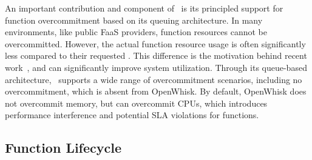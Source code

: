 An important contribution and component of \sysname~is its principled support for function overcommitment based on its queuing architecture.
In many environments, like public FaaS providers, function resources cannot be overcommitted. 
However, the actual function resource usage is often significantly less compared to their requested .
This difference is the motivation behind recent  work~\cite{akhtar_cose_2020, guo_decomposing_2022, tian_owl_2022, eismann2021sizeless, kotni2021faastlane}, and can significantly improve system utilization.
Through its queue-based architecture, \sysname~supports a wide range of overcommitment scenarios, including no overcommitment, which is absent from OpenWhisk.
By default, OpenWhisk does not overcommit memory, but can  overcommit CPUs, which introduces performance interference and potential SLA violations for functions. 





\subsection{Function Lifecycle}
\label{sec:design:lifecycle}

